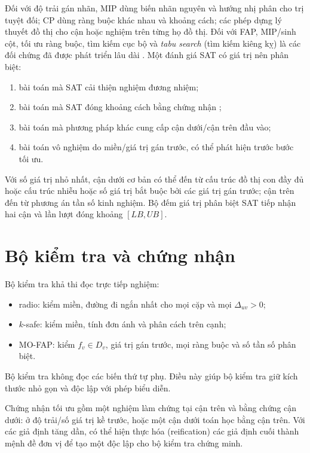 Đối với độ trải gán nhãn, MIP dùng biến nhãn nguyên và hướng nhị phân cho trị
tuyệt đối; CP dùng ràng buộc khác nhau và khoảng cách; các phép dựng lý thuyết
đồ thị cho cận hoặc nghiệm trên từng họ đồ thị. Đối với FAP, MIP/sinh cột, tối
ưu ràng buộc, tìm kiếm cục bộ và \emph{tabu search} (tìm kiếm kiêng kỵ) là các đối
chứng đã được phát triển lâu
dài \parencite{aardal2007frequency}. Một đánh giá SAT
có giá trị nên phân biệt:
\begin{enumerate}
  \item bài toán mà SAT cải thiện nghiệm đương nhiệm;
  \item bài toán mà SAT đóng khoảng cách bằng chứng nhận \UNSAT;
  \item bài toán mà phương pháp khác cung cấp cận dưới/cận trên đầu vào;
  \item bài toán vô nghiệm do miền/giá trị gán trước, có thể phát hiện trước
        bước tối ưu.
\end{enumerate}

Với số giá trị nhỏ nhất, cận dưới cơ bản có thể đến từ cấu trúc đồ thị con đầy
đủ hoặc cấu trúc nhiễu
hoặc số giá trị bắt buộc bởi các giá trị gán trước; cận trên đến từ phương án
tần số kinh nghiệm. Bộ đếm giá trị phân biệt SAT tiếp nhận hai cận và lần lượt đóng
khoảng \([LB,UB]\).

\section{Bộ kiểm tra và chứng nhận}

Bộ kiểm tra khả thi đọc trực tiếp nghiệm:
\begin{itemize}
  \item radio: kiểm miền, đường đi ngắn nhất cho mọi cặp và mọi
        \(\Delta_{uv}>0\);
  \item \(k\)-safe: kiểm miền, tính đơn ánh và phân cách trên cạnh;
  \item MO-FAP: kiểm \(f_v\in D_v\), giá trị gán trước, mọi ràng buộc
        và số tần số phân biệt.
\end{itemize}
Bộ kiểm tra không đọc các biến thứ tự phụ. Điều này giúp bộ kiểm tra giữ kích thước nhỏ gọn và độc lập với
phép biểu diễn.

Chứng nhận tối ưu gồm một nghiệm làm chứng tại cận trên và bằng chứng cận dưới:
\UNSAT ở độ trải/số giá trị kề trước, hoặc một cận dưới toán học bằng cận trên.
Với các giả định tăng dần, có thể hiện thực hóa (reification) các giả định cuối thành mệnh đề đơn
vị để tạo một \CNF độc lập cho bộ kiểm tra chứng minh.

